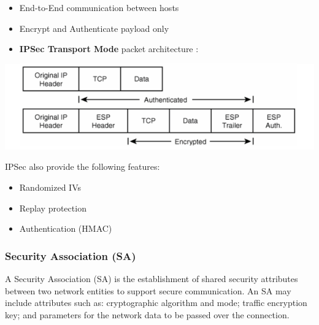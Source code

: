 \documentclass[english, leagacyboxes, nologo]{latex4ei/latex4ei_sheet}
\begin{document}
{      \begin{itemize}
        \item End-to-End communication between hosts
        \item Encrypt and Authenticate payload only
        \item \textbf{IPSec Transport Mode} packet architecture :
      \end{itemize}

      \includegraphics[width=\columnwidth]{img/vpntransport2.png}

      IPSec also provide the following features:
      \begin{itemize}
        \item Randomized IVs
        \item Replay protection
        \item Authentication (HMAC)
      \end{itemize}

    \subsubsection{Security Association (SA)}
      A Security Association (SA) is the establishment of shared security attributes between two network entities to support secure communication. An SA may include attributes such as: cryptographic algorithm and mode; traffic encryption key; and parameters for the network data to be passed over the connection.
  }
\end{document}
